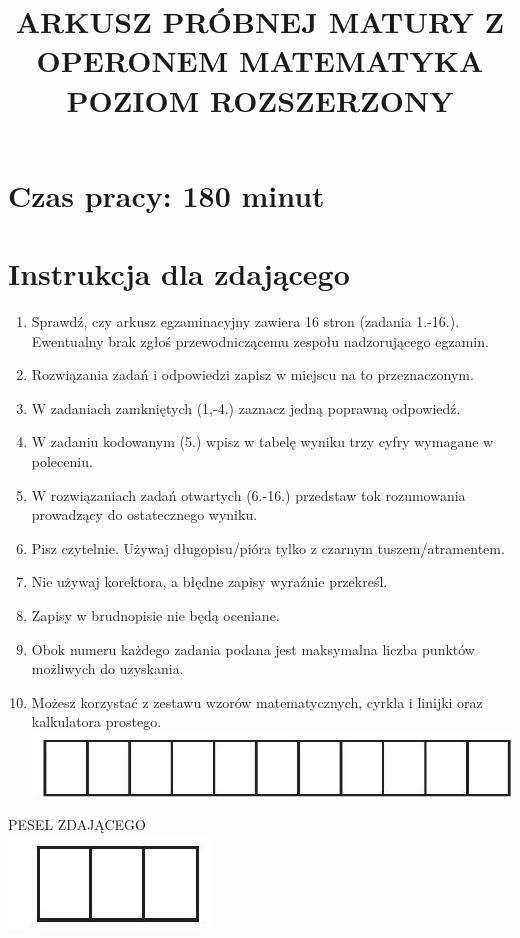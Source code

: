 \documentclass[10pt]{article}
\title{ARKUSZ PRÓBNEJ MATURY Z OPERONEM MATEMATYKA POZIOM ROZSZERZONY }
\author{}
\date{}
\begin{document}
\maketitle
\section*{Czas pracy: 180 minut}
\section*{Instrukcja dla zdającego}
\begin{enumerate}
  \item Sprawdź, czy arkusz egzaminacyjny zawiera 16 stron (zadania 1.-16.). Ewentualny brak zgłoś przewodniczącemu zespołu nadzorującego egzamin.
  \item Rozwiązania zadań i odpowiedzi zapisz w miejscu na to przeznaczonym.
  \item W zadaniach zamkniętych (1,-4.) zaznacz jedną poprawną odpowiedź.
  \item W zadaniu kodowanym (5.) wpisz w tabelę wyniku trzy cyfry wymagane w poleceniu.
  \item W rozwiązaniach zadań otwartych (6.-16.) przedstaw tok rozumowania prowadzący do ostatecznego wyniku.
  \item Pisz czytelnie. Używaj długopisu/pióra tylko z czarnym tuszem/atramentem.
  \item Nie używaj korektora, a błędne zapisy wyraźnie przekreśl.
  \item Zapisy w brudnopisie nie będą oceniane.
  \item Obok numeru każdego zadania podana jest maksymalna liczba punktów możliwych do uzyskania.
  \item Możesz korzystać z zestawu wzorów matematycznych, cyrkla i linijki oraz kalkulatora prostego.\\
\includegraphics[max width=\textwidth, center]{2024_11_21_e30d1f37bf0e3631c088g-01(1)}
\end{enumerate}

PESEL ZDAJĄCEGO\\
\includegraphics[max width=\textwidth, center]{2024_11_21_e30d1f37bf0e3631c088g-01}
\end{document}
